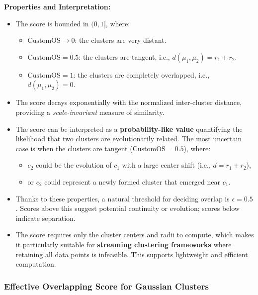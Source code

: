 \textbf{Properties and Interpretation:}
\begin{itemize}
      \item The score is bounded in $ (0, 1] $, where:
            \begin{itemize}
                  \item $ \text{CustomOS} \to 0 $: the clusters are very distant.
                  \item $ \text{CustomOS} = 0.5 $: the clusters are tangent, i.e., $ d(\mu_1, \mu_2) = r_1 + r_2 $.
                  \item $ \text{CustomOS} = 1 $: the clusters are completely overlapped, i.e., $ d(\mu_1, \mu_2) = 0 $.
            \end{itemize}

      \item The score decays exponentially with the normalized inter-cluster distance,
            providing a \textit{scale-invariant} measure of similarity.

      \item The score can be interpreted as a \textbf{probability-like value} quantifying
            the likelihood that two clusters are evolutionarily related. The most uncertain
            case is when the clusters are tangent ($ \text{CustomOS} = 0.5 $), where:
            \begin{itemize}
                  \item $ c_2 $ could be the evolution of $ c_1 $ with a large center shift (i.e., $ d = r_1 + r_2 $),
                  \item or $ c_2 $ could represent a newly formed cluster that emerged near $ c_1 $.
            \end{itemize}

      \item Thanks to these properties, a natural threshold for deciding overlap is $
                  \epsilon = 0.5 $. Scores above this suggest potential continuity or evolution;
            scores below indicate separation.

      \item The score requires only the cluster centers and radii to compute, which makes
            it particularly suitable for \textbf{streaming clustering frameworks} where
            retaining all data points is infeasible. This supports lightweight and
            efficient computation.
\end{itemize}

\subsubsection*{Effective Overlapping Score for Gaussian Clusters}

